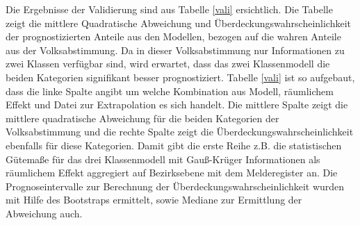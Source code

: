 \documentclass{Vorlage}
\begin{document}
Die Ergebnisse der Validierung sind aus Tabelle \ref{vali} ersichtlich. Die Tabelle zeigt die mittlere Quadratische Abweichung und Überdeckungswahrscheinlichkeit der prognostizierten Anteile aus den Modellen, bezogen auf die wahren Anteile aus der Volksabstimmung. Da in dieser Volksabstimmung nur Informationen zu zwei Klassen verfügbar sind, wird erwartet, dass das zwei Klassenmodell die beiden Kategorien signifikant besser prognostiziert.
Tabelle \ref{vali} ist so aufgebaut, dass die linke Spalte angibt um welche Kombination aus Modell, räumlichem Effekt und Datei zur Extrapolation es sich handelt. Die mittlere Spalte zeigt die mittlere quadratische Abweichung für die beiden Kategorien der Volksabstimmung und die rechte Spalte zeigt die Überdeckungswahrscheinlichkeit ebenfalls für diese Kategorien. Damit gibt die erste Reihe z.B. die statistischen Gütemaße für das drei Klassenmodell mit Gauß-Krüger Informationen als räumlichem Effekt aggregiert auf Bezirksebene mit dem Melderegister an. Die Prognoseintervalle zur Berechnung der Überdeckungswahrscheinlichkeit wurden mit Hilfe des Bootstraps ermittelt, sowie Mediane zur Ermittlung der Abweichung auch.
\end{document}
